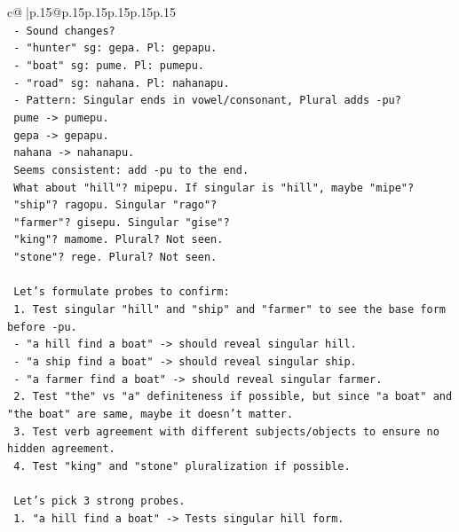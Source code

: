 \documentclass{article}
\begin{document}
{\begin{supertabular}{c@{$\;$}|p{.15\linewidth}@{}p{.15\linewidth}p{.15\linewidth}p{.15\linewidth}p{.15\linewidth}p{.15\linewidth}}
{{{\\ 
\texttt{     {-} Sound changes?} \\
\texttt{       {-} "hunter" sg: gepa. Pl: gepapu.} \\
\texttt{       {-} "boat" sg: pume. Pl: pumepu.} \\
\texttt{       {-} "road" sg: nahana. Pl: nahanapu.} \\
\texttt{       {-} Pattern: Singular ends in vowel/consonant, Plural adds {-}pu?} \\
\texttt{         pume {-}> pumepu.} \\
\texttt{         gepa {-}> gepapu.} \\
\texttt{         nahana {-}> nahanapu.} \\
\texttt{         Seems consistent: add {-}pu to the end.} \\
\texttt{         What about "hill"? mipepu. If singular is "hill", maybe "mipe"?} \\
\texttt{         "ship"? ragopu. Singular "rago"?} \\
\texttt{         "farmer"? gisepu. Singular "gise"?} \\
\texttt{         "king"? mamome. Plural? Not seen.} \\
\texttt{         "stone"? rege. Plural? Not seen.} \\
\\ 
\texttt{     Let's formulate probes to confirm:} \\
\texttt{     1. Test singular "hill" and "ship" and "farmer" to see the base form before {-}pu.} \\
\texttt{        {-} "a hill find a boat" {-}> should reveal singular hill.} \\
\texttt{        {-} "a ship find a boat" {-}> should reveal singular ship.} \\
\texttt{        {-} "a farmer find a boat" {-}> should reveal singular farmer.} \\
\texttt{     2. Test "the" vs "a" definiteness if possible, but since "a boat" and "the boat" are same, maybe it doesn't matter.} \\
\texttt{     3. Test verb agreement with different subjects/objects to ensure no hidden agreement.} \\
\texttt{     4. Test "king" and "stone" pluralization if possible.} \\
\\ 
\texttt{     Let's pick 3 strong probes.} \\
\texttt{     1. "a hill find a boat" {-}> Tests singular hill form.} \\
}}}
\end{supertabular}}
\end{document}
